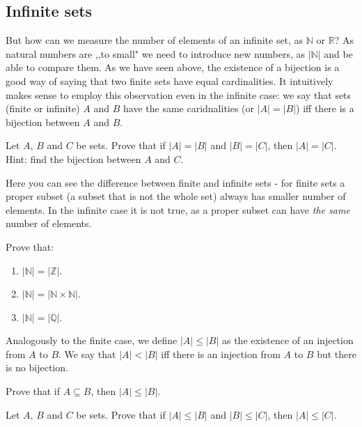 \subsection{Infinite sets}
But how can we measure the number of elements of an infinite set, as $\mathbb N$ or $\mathbb R$? As natural numbers are ,,to small" we need to
introduce new numbers, as $|\mathbb N|$ and be able to compare them. As we have seen above, the existence of a bijection is a good way of saying
that two finite sets have equal cardinalities. It intuitively makes sense to employ this observation even in the infinite case: we say that sets
(finite or infinite) $A$ and $B$ have the same caridnalities (or $|A|=|B|$) iff there is a bijection between $A$ and $B$.

\begin{prob}
	Let $A,\,B$ and $C$ be sets. Prove that if $|A|=|B|$ and $|B|=|C|$, then $|A|=|C|.$ Hint: find the bijection between $A$ and $C$.
\end{prob}

\noindent Here you can see the difference between finite and infinite sets - for finite sets a proper subset (a subset that is not the whole set)
always has smaller number of elements. In the infinite case it is not true, as a proper subset can have \textit{the same} number of elements.

\begin{prob}
	Prove that:
	\begin{enumerate}
		\item $|\mathbb N| = |\mathbb Z|$.
		\item $|\mathbb N|=|\mathbb N\times \mathbb N|$.
		\item $|\mathbb N|=|\mathbb Q|$.
	\end{enumerate}
\end{prob}

\noindent Analogously to the finite case, we define $|A|\le |B|$ as the existence of an injection from $A$ to $B$. We say that $|A|<|B|$ iff there
is an injection from $A$ to $B$ but there is no bijection.

\begin{prob}
	Prove that if $A\subseteq B$, then $|A|\le|B|.$
\end{prob}

\begin{prob}
	Let $A,\,B$ and $C$ be sets. Prove that if $|A|\le |B|$ and $|B|\le |C|$, then $|A|\le |C|$.
\end{prob}

